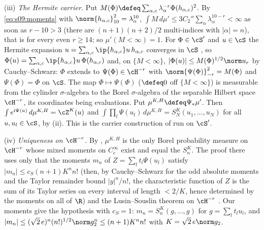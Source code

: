 (iii) \emph{The Hermite carrier.} Put $M(\Phi)\defeq\sum_{\alpha,c}\lambda_\alpha^{-r}\Phi(h_{\alpha,c})^2$. By \eqref{eq:s09:moments} with $\norm{h_{\alpha,c}}_{10}^2=\lambda_\alpha^{10}$, $\int M\,d\mu'\le3C_2''\sum_\alpha\lambda_\alpha^{10-r}<\infty$ as soon as $r-10>3$ (there are $(n+1)(n+2)/2$ multi-indices with $|\alpha|=n$), that is for every even $r\ge14$; so $\mu'(M<\infty)=1$. For $\Phi\in\cS'$ and $u\in\cS$ the Hermite expansion $u=\sum_{\alpha,c}\ip{h_{\alpha,c}}u\,h_{\alpha,c}$ converges in $\cS$ \cite[Thm.~V.13]{RS1}, so $\Phi(u)=\sum_{\alpha,c}\ip{h_{\alpha,c}}u\,\Phi(h_{\alpha,c})$ and, on $\{M<\infty\}$, $|\Phi(u)|\le M(\Phi)^{1/2}\norm u_r$ by Cauchy--Schwarz: $\Phi$ extends to $\Psi(\Phi)\in\cH^{-r}$ with $\norm{\Psi(\Phi)}_{-r}^2=M(\Phi)$ and $\Psi(\Phi)=\Phi$ on $\cS$. The map $\Phi\mapsto\Psi(\Phi)$ ($\defeq0$ off $\{M<\infty\}$) is measurable from the cylinder $\sigma$-algebra to the Borel $\sigma$-algebra of the separable Hilbert space $\cH^{-r}$, its coordinates being evaluations. Put $\mu^{K,H}\defeq\Psi_*\mu'$. Then $\int e^{\mathrm i\Psi(u)}\,d\mu^{K,H}=\cZ^K(u)$ and $\int\prod_l\Psi(u_l)\,d\mu^{K,H}=S^K_N(u_1,\dots,u_N)$ for all $u,u_l\in\cS$, by (ii). This is the carrier construction of \cite[lem:D:hermite(b)]{SymPhase} run on $\cS'$.

(iv) \emph{Uniqueness on $\cH^{-r}$.} By \cite[lem:D:hermite(c)]{SymPhase}, $\mu^{K,H}$ is the only Borel probability measure on $\cH^{-r}$ whose mixed moments on $C^\infty_c$ exist and equal the $S^K_n$. The proof there uses only that the moments $m_n$ of $Z=\sum_lt_l\Psi(u_l)$ satisfy $|m_n|\le c_S(n+1)K^nn!$ (then, by Cauchy--Schwarz for the odd absolute moments and the Taylor remainder bound $|y|^n/n!$, the characteristic function of $Z$ is the sum of its Taylor series on every interval of length $<2/K$, hence determined by the moments on all of $\R$) and the Lusin--Souslin theorem on $\cH^{-r}$ \cite{Kec95}. Our moments give the hypothesis with $c_S=1$: $m_n=S^K_n(g,\dots,g)$ for $g=\sum_lt_lu_l$, and $|m_n|\le(\sqrt2\,e)^n(n!)^{1/2}\norm g_2^n\le(n+1)K^nn!$ with $K=\sqrt2\,e\norm g_2$.

